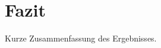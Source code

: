 \documentclass[conference,compsoc]{IEEEtran}
\begin{document}
\section{Fazit}
Kurze Zusammenfassung des Ergebnisses.


%
%



%
%
\end{document}
